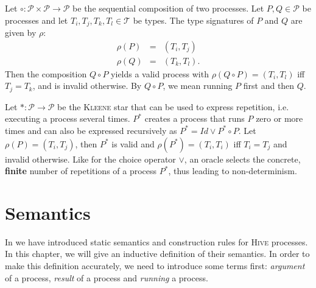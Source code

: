 \begin{definition}
\label{def:static_sequence}
Let $\circ \colon \mathcal{P} \times \mathcal{P} \to \mathcal{P}$ be the sequential composition of two processes. Let $P, Q \in \mathcal{P}$ be processes and let $T_i, T_j, T_k, T_l \in \mathcal{T}$ be types. The type signatures of $P$ and $Q$ are given by $\rho$: 
\begin{eqnarray*}
  \rho \left( P \right) & = & \left( T_i, T_j \right) \\
  \rho \left( Q \right) & = & \left( T_k, T_l \right).
\end{eqnarray*}
Then the composition $Q \circ P$ yields a valid process with $\rho \left( Q \circ P \right) = \left( T_i, T_l \right)$ iff $T_j = T_k$, and is invalid otherwise. By $Q \circ P$, we mean running $P$ first and then $Q$.

\hfill\qedsymbol
\end{definition}


\begin{definition}
\label{def:static_kleene}
Let $* \colon \mathcal{P} \to \mathcal{P}$ be the \textsc{Kleene} star that can be used to express repetition, i.e. executing a process several times. $P^*$ creates a process that runs $P$ zero or more times and can also be expressed recursively as $P^* = Id \vee P^* \circ P$. Let $\rho \left( P \right) = \left( T_i, T_j \right)$, then $P^*$ is valid and $\rho \left( P^* \right) = \left( T_i, T_i \right)$ iff $T_i = T_j$ and invalid otherwise. Like for the choice operator $\vee$, an oracle selects the concrete, \textbf{finite} number of repetitions of a process $P^*$, thus leading to non-determinism.

\hfill\qedsymbol
\end{definition}




\section{Semantics}
\label{chp:semantics}
In  we have introduced static semantics and construction rules for \textsc{Hive} processes. In this chapter, we will give an inductive definition of their semantics. In order to make this definition accurately, we need to introduce some terms first: \textit{argument} of a process, \textit{result} of a process and \textit{running} a process.


